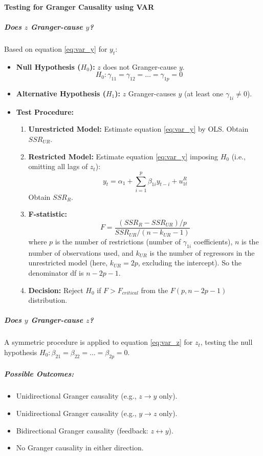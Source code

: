 \documentclass[a4paper, 10pt]{article}
\theoremstyle{definition}	%
\begin{document}
\paragraph{Testing for Granger Causality using VAR}
\subparagraph{Does \(z\) Granger-cause \(y\)?}
Based on equation \eqref{eq:var_y} for \(y_t\):
\begin{itemize}
    \item \textbf{Null Hypothesis (\(H_0\)):} \(z\) does not Granger-cause \(y\).
    \[ H_0: \gamma_{11} = \gamma_{12} = \dots = \gamma_{1p} = 0 \]
    \item \textbf{Alternative Hypothesis (\(H_1\)):} \(z\) Granger-causes \(y\) (at least one \(\gamma_{1i} \neq 0\)).
    \item \textbf{Test Procedure:}
    \begin{enumerate}
        \item \textbf{Unrestricted Model:} Estimate equation \eqref{eq:var_y} by OLS. Obtain \(SSR_{UR}\).
        \item \textbf{Restricted Model:} Estimate equation \eqref{eq:var_y} imposing \(H_0\) (i.e., omitting all lags of \(z_t\)):
        \[ y_t = \alpha_1 + \sum_{i=1}^p \beta_{1i} y_{t-i} + u_{1t}^R \]
        Obtain \(SSR_R\).
        \item \textbf{F-statistic:}
        \[ F = \frac{(SSR_R - SSR_{UR})/p}{SSR_{UR}/(n - k_{UR} - 1)} \]
        where \(p\) is the number of restrictions (number of \(\gamma_{1i}\) coefficients), \(n\) is the number of observations used, and \(k_{UR}\) is the number of regressors in the unrestricted model (here, \(k_{UR} = 2p\), excluding the intercept). So the denominator df is \(n - 2p - 1\).
        \item \textbf{Decision:} Reject \(H_0\) if \(F > F_{critical}\) from the \(F(p, n-2p-1)\) distribution.
    \end{enumerate}
\end{itemize}

\subparagraph{Does \(y\) Granger-cause \(z\)?}
A symmetric procedure is applied to equation \eqref{eq:var_z} for \(z_t\), testing the null hypothesis \(H_0: \beta_{21} = \beta_{22} = \dots = \beta_{2p} = 0\).

\subparagraph{Possible Outcomes:}
\begin{itemize}
    \item Unidirectional Granger causality (e.g., \(z \rightarrow y\) only).
    \item Unidirectional Granger causality (e.g., \(y \rightarrow z\) only).
    \item Bidirectional Granger causality (feedback: \(z \leftrightarrow y\)).
    \item No Granger causality in either direction.
\end{itemize}
\end{document}
